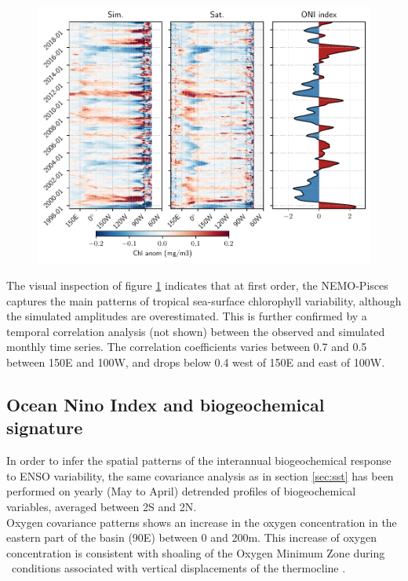 \begin{figure}[h!]
	\centering
	\includegraphics[scale=0.75] {figs/hov_chl.pdf}
	\caption{}
	\label{fig:hov_chl}
\end{figure}

The visual inspection of figure \ref{fig:hov_chl} indicates that at first order, the NEMO-Pisces captures the main patterns of tropical sea-surface chlorophyll variability, although the simulated amplitudes are overestimated. This is further confirmed by a temporal correlation analysis (not shown) between the observed and simulated monthly time series. The correlation coefficients varies between 0.7 and 0.5 between 150\degree E and 100\degree W, and drops below 0.4 west of 150\degree E and east of 100\degree W.

\subsection{Ocean Nino Index and biogeochemical signature}

In order to infer the spatial patterns of the interannual biogeochemical response to ENSO variability, the same covariance analysis as in section \ref{sec:sst} has been performed on yearly (May to April) detrended profiles of biogeochemical variables, averaged between 2\degree S and 2\degree N.\\

Oxygen covariance patterns shows an increase in the oxygen concentration in the eastern part of the basin (90E) between 0 and 200m. This increase of oxygen concentration 
is consistent with shoaling of the Oxygen Minimum Zone during \nino\ conditions associated with vertical displacements of the thermocline \citep{leungENSODrivesNearsurface2019, espinoza-morriberonOxygenVariabilityENSO2019}. \\

